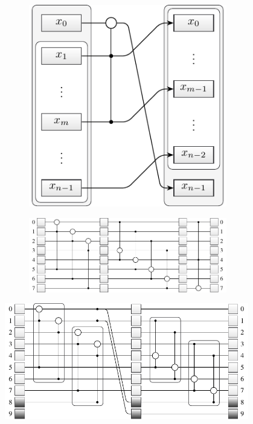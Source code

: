 \documentclass{stdlocal}
\begin{document}
    \begin{figure}
      \center
      \begin{subfigure}[b]{0.3\textwidth}
        \center
        \includegraphics[width=0.95\textwidth]{figures/mt19937_transition_short.pdf}
      \end{subfigure}
      \begin{subfigure}[b]{0.68\textwidth}
        \center
        \includegraphics[width=0.95\textwidth]{figures/mt19937_loop_scheme.pdf}
      \end{subfigure}
      \caption[Mersenne Twister Loop Scheme]{}
      \label{fig:mt-loop-scheme}
    \end{figure}

    \begin{figure}
      \center
      \includegraphics[width=0.95\textwidth]{figures/mt19937_vector_loop_scheme.pdf}
      \caption[Mersenne Twister Vector Loop Scheme]{}
      \label{fig:mt-vector-loop-scheme}
    \end{figure}
\end{document}
